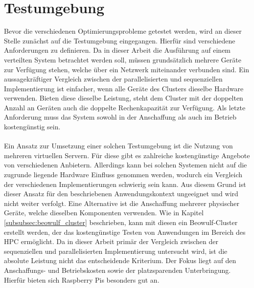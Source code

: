 \section{Testumgebung}
\label{sec:analysis_testsetup}
Bevor die verschiedenen Optimierungsprobleme getestet werden, wird an dieser Stelle zunächst auf die Testumgebung eingegangen. Hierfür sind verschiedene Anforderungen zu definieren. Da in dieser Arbeit die Ausführung auf einem verteilten System betrachtet werden soll, müssen grundsätzlich mehrere Geräte zur Verfügung stehen, welche über ein Netzwerk miteinander verbunden sind. Ein aussagekräftiger Vergleich zwischen der parallelisierten und sequenziellen Implementierung ist einfacher, wenn alle Geräte des Clusters dieselbe Hardware verwenden. Bieten diese dieselbe Leistung, steht dem Cluster mit der doppelten Anzahl an Geräten auch die doppelte Rechenkapazität zur Verfügung. Als letzte Anforderung muss das System sowohl in der Anschaffung als auch im Betrieb kostengünstig sein.
\\\\
Ein Ansatz zur Umsetzung einer solchen Testumgebung ist die Nutzung von mehreren virtuellen Servern. Für diese gibt es zahlreiche kostengünstige Angebote von verschiedenen Anbietern. Allerdings kann bei solchen Systemen nicht auf die zugrunde liegende Hardware Einfluss genommen werden, wodurch ein Vergleich der verschiedenen Implementierungen schwierig sein kann. Aus diesem Grund ist dieser Ansatz für den beschriebenen Anwendungskontext ungeeignet und wird nicht weiter verfolgt. Eine Alternative ist die Anschaffung mehrerer physischer Geräte, welche dieselben Komponenten verwenden. Wie in Kapitel \ref{subsubsec:beowulf_cluster} beschrieben, kann mit diesen ein Beowulf-Cluster erstellt werden, der das kostengünstige Testen von Anwendungen im Bereich des \ac{HPC} ermöglicht. Da in dieser Arbeit primär der Vergleich zwischen der sequenziellen und parallelisierten Implementierung untersucht wird, ist die absolute Leistung nicht das entscheidende Kriterium. Der Fokus liegt auf den Anschaffungs- und Betriebskosten sowie der platzsparenden Unterbringung. Hierfür bieten sich Raspberry Pis besonders gut an.  
\\\\
